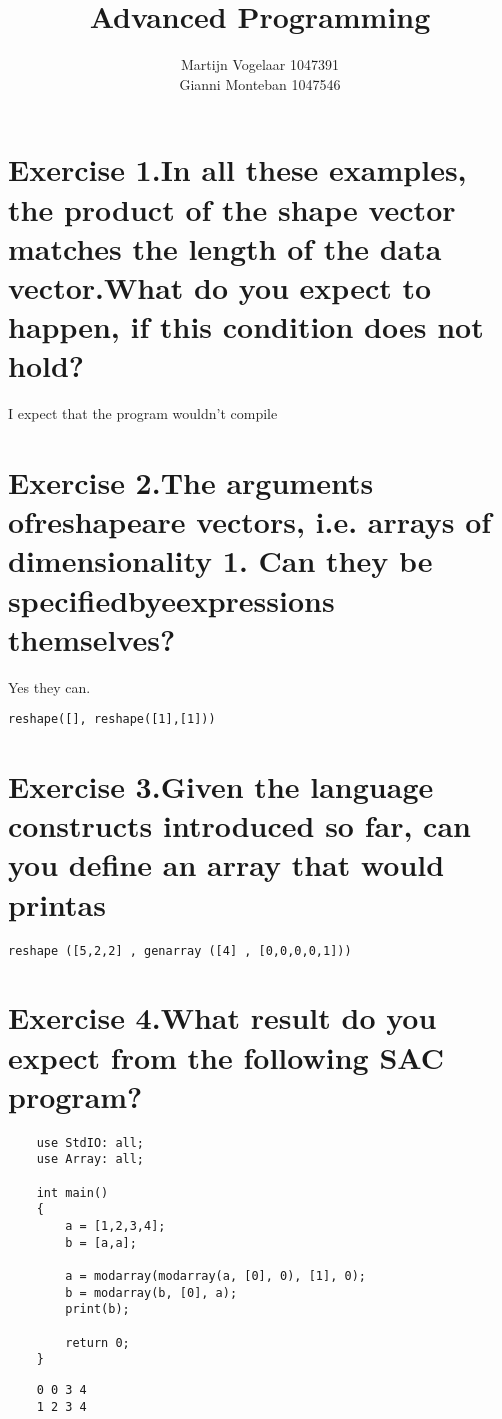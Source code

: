 \documentclass[a4paper]{article}
\title{Advanced Programming }
\author{Martijn Vogelaar 1047391 \\ Gianni Monteban 1047546}
\begin{document}
\maketitle

\section*{Exercise 1.In all these examples, the product of the shape vector matches the length of the data vector.What do you expect to happen, if this condition does not hold?}
I expect that the program wouldn't compile
\section*{Exercise 2.The arguments ofreshapeare vectors, i.e. arrays of dimensionality 1. Can they be specifiedbyeexpressions themselves?}
Yes they can.
\begin{verbatim}
reshape([], reshape([1],[1]))
\end{verbatim}
\section*{Exercise 3.Given the language constructs introduced so far, can you define an array that would printas}
\begin{verbatim}
reshape ([5,2,2] , genarray ([4] , [0,0,0,0,1]))
\end{verbatim}
\section*{Exercise 4.What result do you expect from the following SAC program?}
\begin{verbatim}
    use StdIO: all;
    use Array: all;
    
    int main()
    {
        a = [1,2,3,4];
        b = [a,a];
        
        a = modarray(modarray(a, [0], 0), [1], 0);
        b = modarray(b, [0], a);
        print(b);
        
        return 0;
    }
\end{verbatim}
\begin{verbatim}
    0 0 3 4
    1 2 3 4
\end{verbatim}
\end{document}
